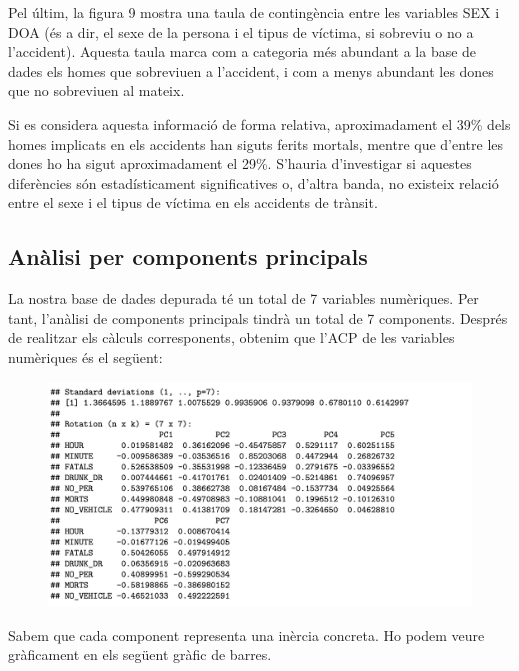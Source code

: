 \documentclass[11pt,longbibliography]{article}
\theoremstyle{definition}
\theoremstyle{remark}
\begin{document}
Pel últim, la figura 9 mostra una taula de contingència entre les variables SEX i DOA (és a dir, el sexe de la persona i el tipus de víctima, si sobreviu o no a l'accident). Aquesta taula marca com a categoria més abundant a la base de dades els homes que sobreviuen a l'accident, i com a menys abundant les dones que no sobreviuen al mateix. 


Si es considera aquesta informació de forma relativa, aproximadament el 39\% dels homes implicats en els accidents han siguts ferits mortals, mentre que d'entre les dones ho ha sigut aproximadament el 29\%. S'hauria d'investigar si aquestes diferències són estadísticament significatives o, d'altra banda, no existeix relació entre el sexe i el tipus de víctima en els accidents de trànsit.


\subsection{Anàlisi per components principals}


La nostra base de dades depurada té un total de 7 variables numèriques. Per tant, l'anàlisi de components principals tindrà un total de 7 components. Després de realitzar els càlculs corresponents, obtenim que l'ACP de les variables numèriques és el següent:

\begin{figure}[H]
\begin{center}
\includegraphics[width=14.5cm]{acp1}
\end{center}
\label{fig:ACP1}
\end{figure}


Sabem que cada component representa una inèrcia concreta. Ho podem veure gràficament en els següent gràfic de barres.
\end{document}
